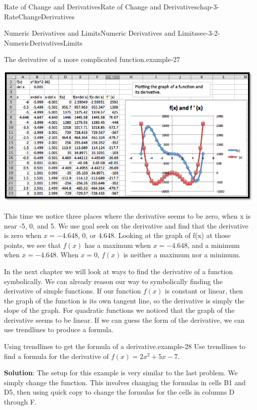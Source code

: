 \documentclass[oneside,10pt,]{book}
\newcommand{\terminology}[1]{\textbf{#1}}
\numberwithin{equation}{section}
\begin{document}
\begin{chapterptx}{Rate of Change and Derivatives}{}{Rate of Change and Derivatives}{}{}{chap-3-RateChangeDerivatives}
\begin{sectionptx}{Numeric Derivatives and Limits}{}{Numeric Derivatives and Limits}{}{}{sec-3-2-NumericDerivativesLimits}
\begin{example}{The derivative of a more complicated function.}{example-27}
\begin{sidebyside}{1}{0}{0}{0}
\begin{sbspanel}{1}
\includegraphics[width=1\linewidth]{images/sec3-2-9.png}
\end{sbspanel}%
\end{sidebyside}%
\par
\hypertarget{p-1043}{}%
This time we notice three places where the derivative seems to be zero, when x is near -5, 0, and 5.  We use goal seek on the derivative and find that the derivative is zero when \(x=-4.648\), 0, or 4.648.  Looking at the graph of f(x) at those points, we see that \(f(x)\) has a maximum when \(x=-4.648\), and a minimum when \(x=-4.648\).  When \(x=0\), \(f(x)\) is neither a maximum nor a minimum.%
\end{example}
\hypertarget{p-1044}{}%
In the next chapter we will look at ways to find the derivative of a function symbolically.  We can already reason our way to symbolically finding the derivative of simple functions.  If our function \(f(x)\) is constant or linear, then the graph of the function is its own tangent line, so the derivative is simply the slope of the graph.  For quadratic functions we noticed that the graph of the derivative seems to be linear.  If we can guess the form of the derivative, we can use trendlines to produce a formula.%
\begin{example}{Using trendlines to get the formula of a derivative.}{example-28}%
\hypertarget{p-1045}{}%
Use trendlines to find a formula for the derivative of \(f(x)=2x^2+5x-7\).%
\par
\hypertarget{p-1046}{}%
\terminology{Solution}: The setup for this example is very similar to the last problem.  We simply change the function.  This involves changing the formulas in cells B1 and D5, then using quick copy to change the formulas for the cells in columns D through F.%
\begin{sidebyside}{1}{0}{0}{0}%
\begin{sbspanel}{1}%

\end{sbspanel}
\end{sidebyside}
\end{example}
\end{sectionptx}
\end{chapterptx}
\end{document}
